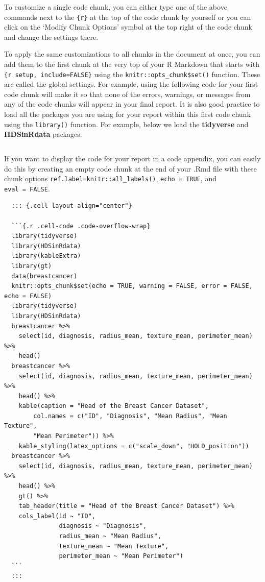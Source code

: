 \documentclass[
  letterpaper,
]{krantz}
\begin{document}
To customize a single code chunk, you can either type one of the above
commands next to the \texttt{\{r\}} at the top of the code chunk by
yourself or you can click on the `Modify Chunk Options' symbol at the
top right of the code chunk and change the settings there.

To apply the same customizations to all chunks in the document at once,
you can add them to the first chunk at the very top of your R Markdown
that starts with
\texttt{\textasciigrave{}\textasciigrave{}\textasciigrave{}\{r\ setup,\ include=FALSE\}}
using the \texttt{knitr::opts\_chunk\$set()} function. These are called
the global settings. For example, using the following code for your
first code chunk will make it so that none of the errors, warnings, or
messages from any of the code chunks will appear in your final report.
It is also good practice to load all the packages you are using for your
report within this first code chunk using the \texttt{library()}
function. For example, below we load the \textbf{tidyverse} and
\textbf{HDSinRdata} packages.

\begin{verbatim}
\end{verbatim}

If you want to display the code for your report in a code appendix, you
can easily do this by creating an empty code chunk at the end of your
.Rmd file with these chunk options
\texttt{ref.label=knitr::all\_labels()}, \texttt{echo\ =\ TRUE}, and
\texttt{eval\ =\ FALSE}.

\begin{verbatim}
  ::: {.cell layout-align="center"}
  
  ```{.r .cell-code .code-overflow-wrap}
  library(tidyverse)
  library(HDSinRdata)
  library(kableExtra)
  library(gt)
  data(breastcancer)
  knitr::opts_chunk$set(echo = TRUE, warning = FALSE, error = FALSE, echo = FALSE)
  library(tidyverse)
  library(HDSinRdata)
  breastcancer %>% 
    select(id, diagnosis, radius_mean, texture_mean, perimeter_mean) %>%   
    head()
  breastcancer %>% 
    select(id, diagnosis, radius_mean, texture_mean, perimeter_mean) %>% 
    head() %>% 
    kable(caption = "Head of the Breast Cancer Dataset", 
        col.names = c("ID", "Diagnosis", "Mean Radius", "Mean Texture", 
        "Mean Perimeter")) %>%   
    kable_styling(latex_options = c("scale_down", "HOLD_position"))
  breastcancer %>% 
    select(id, diagnosis, radius_mean, texture_mean, perimeter_mean) %>% 
    head() %>% 
    gt() %>%
    tab_header(title = "Head of the Breast Cancer Dataset") %>%
    cols_label(id ~ "ID", 
               diagnosis ~ "Diagnosis", 
               radius_mean ~ "Mean Radius", 
               texture_mean ~ "Mean Texture",
               perimeter_mean ~ "Mean Perimeter")
  ```
  :::
\end{verbatim}
\end{document}
